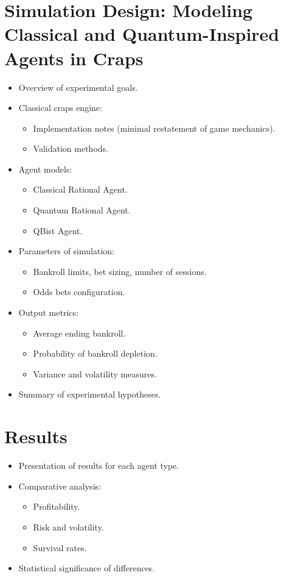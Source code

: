 \documentclass[12pt]{article}
\begin{document}
\section{Simulation Design: Modeling Classical and Quantum-Inspired Agents in Craps}
\begin{itemize}
    \item Overview of experimental goals.
    \item Classical craps engine:
    \begin{itemize}
        \item Implementation notes (minimal restatement of game mechanics).
        \item Validation methods.
    \end{itemize}
    \item Agent models:
    \begin{itemize}
        \item Classical Rational Agent.
        \item Quantum Rational Agent.
        \item QBist Agent.
    \end{itemize}
    \item Parameters of simulation:
    \begin{itemize}
        \item Bankroll limits, bet sizing, number of sessions.
        \item Odds bets configuration.
    \end{itemize}
    \item Output metrics:
    \begin{itemize}
        \item Average ending bankroll.
        \item Probability of bankroll depletion.
        \item Variance and volatility measures.
    \end{itemize}
    \item Summary of experimental hypotheses.
\end{itemize}

\section{Results}
\begin{itemize}
    \item Presentation of results for each agent type.
    \item Comparative analysis:
    \begin{itemize}
        \item Profitability.
        \item Risk and volatility.
        \item Survival rates.
    \end{itemize}
    \item Statistical significance of differences.
\end{itemize}
\end{document}
